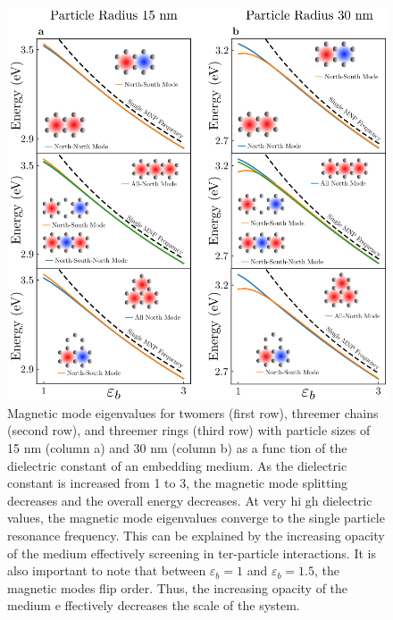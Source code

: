 \documentclass[journal=apchd5,manuscript=article]{achemso}
\begin{document}
\begin{figure}
\centering
\includegraphics[width=.65\paperwidth]{dielectric_study.png}
\caption{Magnetic mode eigenvalues for twomers (first row), threemer chains (second row), and threemer rings (third row) with particle sizes of 15 nm (column a) and 30 nm (column b) as a func
tion of the dielectric constant of an embedding medium. As the dielectric constant is increased from 1 to 3, the magnetic mode splitting decreases and the overall energy decreases. At very hi
gh dielectric values, the magnetic mode eigenvalues converge to the single particle resonance frequency. This can be explained by the increasing opacity of the medium effectively screening in
ter-particle interactions. It is also important to note that between $\varepsilon_b = 1$ and $\varepsilon_b = 1.5$, the magnetic modes flip order. Thus, the increasing opacity of the medium e
ffectively decreases the scale of the system.}
\label{fig:dielectric}
\end{figure}
\end{document}
